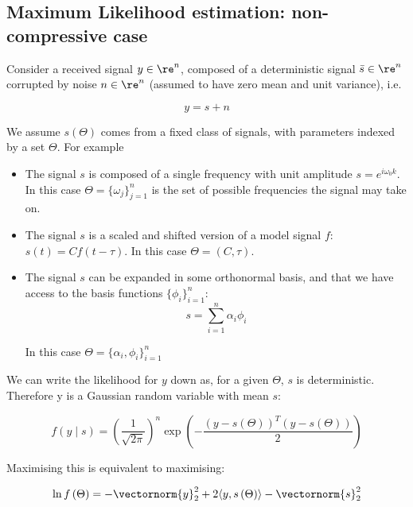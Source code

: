 \subsection{Maximum Likelihood estimation: non-compressive case}\label{sec:max-like}

Consider a received signal \(y \in \re^n\), composed of a deterministic signal \(\bar{s} \in \re^n\) corrupted by noise \(n \in \re^n\) (assumed to have zero mean and unit variance), i.e.

\begin{equation}
y = s + n
\end{equation}

We assume \(s\left(\Theta\right)\) comes from a fixed class of signals, with parameters indexed by a set \(\Theta\). For example

\begin{itemize}
\item The signal \(s\) is composed of a single frequency with unit amplitude \(s = e^{i \omega_0 k}\). In this case \( \Theta = \{\omega_j\}_{j=1}^n \) is the set of possible frequencies the signal may take on.

\item The signal \(s\) is a scaled and shifted version of a model signal \(f\): \(s(t) = Cf\left(t - \tau\right)\). In this case \(\Theta = \left(C, \tau \right)\).

\item The signal \(s\) can be expanded in some orthonormal basis, and that we have access to the basis functions \(\{\phi_i\}_{i=1}^n\):
\begin{equation}
s = \sum_{i=1}^n \alpha_i \phi_i
\end{equation}

In this case \(\Theta = \{\alpha_i, \phi_i\}_{i=1}^n\)

\end{itemize}

We can write the likelihood for \(y\) down as, for a given \(\Theta\), \(s\) is deterministic. Therefore y is a Gaussian random variable with mean \(s\):

\begin{equation}
f\left(y \mid s\right) = \left(\frac{1}{\sqrt{2\pi}} \right)^n \exp{\left( - \frac{\left(y-s(\Theta)\right)^T\left(y-s(\Theta)\right)}{2} \right)}
\end{equation}

Maximising this is equivalent to maximising:

\begin{equation}
\ln f\left(\Theta\right) = -\vectornorm{y}_2^2 + 2\langle y, s\left(\Theta\right)\rangle - \vectornorm{s}_2^2
\end{equation}

